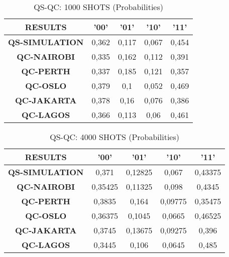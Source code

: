 \begin{table}[!ht]
    \centering
    \begin{tabular}{ccccc}
    \hline
        \textbf{RESULTS} & \textbf{'00'} & \textbf{'01'} & \textbf{'10'} & \textbf{'11' } \\ \hline
        \textbf{QS-SIMULATION} & 0,362 & 0,117 & 0,067 & 0,454  \\ 
        \textbf{QC-NAIROBI} & 0,335 & 0,162 & 0,112 & 0,391  \\ 
        \textbf{QC-PERTH} & 0,337 & 0,185 & 0,121 & 0,357  \\ 
        \textbf{QC-OSLO} & 0,379 & 0,1 & 0,052 & 0,469  \\ 
        \textbf{QC-JAKARTA} & 0,378 & 0,16 & 0,076 & 0,386  \\ 
        \textbf{QC-LAGOS} & 0,366 & 0,113 & 0,06 & 0,461 \\ \hline
    \end{tabular}
    \caption{QS-QC: 1000 SHOTS (Probabilities)}
\end{table}

\begin{table}[!ht]
    \centering
    \begin{tabular}{ccccc}
    \hline
        \textbf{RESULTS} & \textbf{'00'} & \textbf{'01'} & \textbf{'10'} & \textbf{'11' } \\ \hline
        \textbf{QS-SIMULATION} & 0,371 & 0,12825 & 0,067 & 0,43375  \\ 
        \textbf{QC-NAIROBI} & 0,35425 & 0,11325 & 0,098 & 0,4345  \\ 
        \textbf{QC-PERTH} & 0,3835 & 0,164 & 0,09775 & 0,35475  \\ 
        \textbf{QC-OSLO} & 0,36375 & 0,1045 & 0,0665 & 0,46525  \\ 
        \textbf{QC-JAKARTA} & 0,3745 & 0,13675 & 0,09275 & 0,396  \\ 
        \textbf{QC-LAGOS} & 0,3445 & 0,106 & 0,0645 & 0,485 \\ \hline
    \end{tabular}
    \caption{QS-QC: 4000 SHOTS (Probabilities)}
\end{table}

